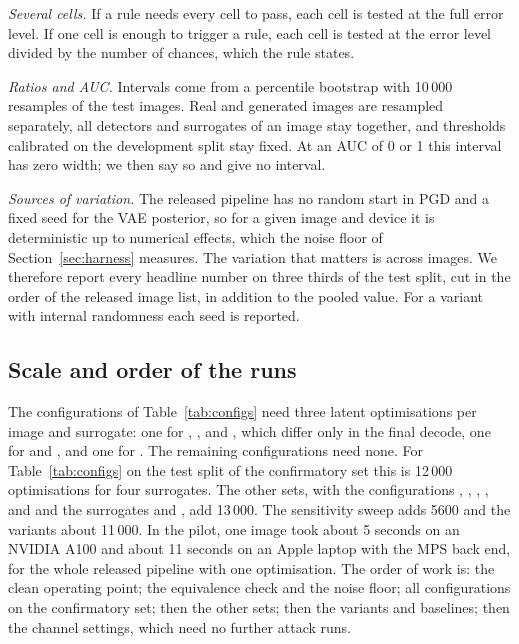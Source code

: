 \emph{Several cells.} If a rule needs every cell to pass, each cell is tested at the full error
level. If one cell is enough to trigger a rule, each cell is tested at the error level divided by
the number of chances, which the rule states.

\emph{Ratios and AUC.} Intervals come from a percentile bootstrap  with
10\,000 resamples of the test images. Real and generated images are resampled separately, all
detectors and surrogates of an image stay together, and thresholds calibrated on the development
split stay fixed. At an AUC of 0 or 1 this interval has zero width; we then say so and give no
interval.

\emph{Sources of variation.} The released pipeline has no random start in PGD and a fixed seed for
the VAE posterior, so for a given image and device it is deterministic up to numerical effects,
which the noise floor of Section~\ref{sec:harness} measures. The variation that matters is across
images. We therefore report every headline number on three thirds of the test split, cut in the
order of the released image list, in addition to the pooled value. For a variant with internal
randomness each seed is reported.

\subsection{Scale and order of the runs}
\label{sec:scale}

The configurations of Table~\ref{tab:configs} need three latent optimisations per image and
surrogate: one for , ,  and , which differ only in the final decode,
one for  and , and one for . The remaining configurations need none. For
Table~\ref{tab:configs} on the test split of the confirmatory set this is 12\,000 optimisations
for four surrogates. The other sets, with the configurations , , ,
,  and  and the surrogates \detE and \detS, add 13\,000. The sensitivity
sweep adds 5600 and the variants about 11\,000. In the pilot, one image took about 5 seconds on
an NVIDIA A100 and about 11 seconds on an Apple laptop with the MPS back end, for the whole
released pipeline with one optimisation.  The order of work is: the clean operating point; the
equivalence check and the noise floor; all configurations on the confirmatory set; then the other
sets; then the variants and baselines; then the channel settings, which need no further attack
runs.

